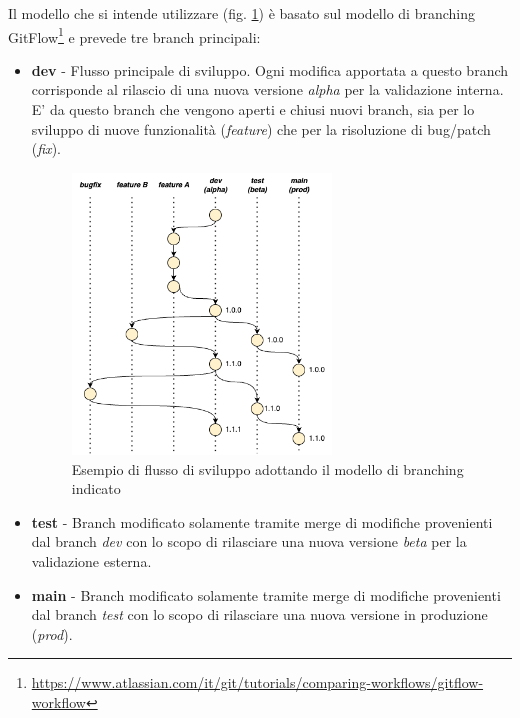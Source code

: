 Il modello che si intende utilizzare (fig. \ref{branching}) è basato sul modello di branching GitFlow\footnote{\href{https://www.atlassian.com/it/git/tutorials/comparing-workflows/gitflow-workflow}{https://www.atlassian.com/it/git/tutorials/comparing-workflows/gitflow-workflow}} e prevede tre branch principali:

\begin{itemize}
    \item \textbf{dev} - Flusso principale di sviluppo. Ogni modifica apportata a questo branch corrisponde al rilascio di una nuova versione \textit{alpha} per la validazione interna. E' da questo branch che vengono aperti e chiusi nuovi branch, sia per lo sviluppo di nuove funzionalità (\textit{feature}) che per la risoluzione di bug/patch (\textit{fix}).

    \begin{figure}[H]
        \centering
        \includegraphics[width=0.65\textwidth]{img/branching-model.png}
        \caption{Esempio di flusso di sviluppo adottando il modello di branching indicato}
        \label{branching}
    \end{figure}
    
    \item \textbf{test} - Branch modificato solamente tramite merge di modifiche provenienti dal branch \textit{dev} con lo scopo di rilasciare una nuova versione \textit{beta} per la validazione esterna.
    \item \textbf{main} - Branch modificato solamente tramite merge di modifiche provenienti dal branch \textit{test} con lo scopo di rilasciare una nuova versione in produzione (\textit{prod}).
\end{itemize}

